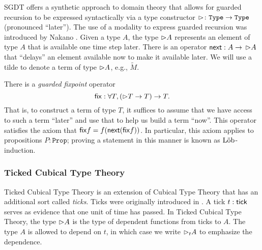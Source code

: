 SGDT offers a synthetic approach to domain theory that allows for guarded
recursion to be expressed syntactically via a type constructor ${\vartriangleright} \colon
\texttt{Type} \to \texttt{Type}$ (pronounced ``later''). The use of a modality to express
guarded recursion was introduced by Nakano \cite{Nakano2000}.
%
Given a type $A$, the type ${\vartriangleright} A$ represents an element of type $A$ that is
available one time step later. There is an operator $\mathsf{next} : A \to\, {\vartriangleright} A$
that ``delays'' an element available now to make it available later. We will use
a tilde to denote a term of type ${\vartriangleright} A$, e.g., $\tilde{M}$.


There is a \emph{guarded fixpoint} operator
%
\[
  \mathsf{fix} : \forall T, ({\vartriangleright} T \to T) \to T.
\]
%
That is, to construct a term of type $T$, it suffices to assume that we have
access to such a term ``later'' and use that to help us build a term ``now''.
This operator satisfies the axiom that $\mathsf{fix} f = f (\mathsf{next} (\mathsf{fix} f))$. In
particular, this axiom applies to propositions $P : \texttt{Prop}$; proving a
statement in this manner is known as $\text{L\"{o}b}$-induction.

\subsubsection{Ticked Cubical Type Theory}

Ticked Cubical Type Theory \cite{mogelberg-veltri2019} is an extension of
Cubical Type Theory \cite{CohenCoquandHuberMortberg2017} that has an additional
sort called \emph{ticks}. Ticks were originally introduced in
\cite{bahr-grathwohl-bugge-mogelberg2017}. A tick $t : \mathsf{tick}$ serves as evidence
that one unit of time has passed. In Ticked Cubical Type Theory, the type
${\vartriangleright} A$ is the type of dependent functions from ticks to $A$. The type $A$ is
allowed to depend on $t$, in which case we write ${\vartriangleright}_t A$ to emphasize the
dependence.



